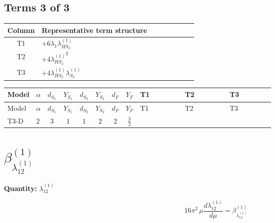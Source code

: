 \documentclass[8pt]{article}
\begin{document}
\begin{landscape}
\subsection*{Terms 3 of 3}
\begin{center}
\begin{tabular}{@{}c >{\raggedright\arraybackslash}p{0.82\linewidth}@{}}
\toprule
Column & Representative term structure \\
\midrule
T1 & \(\displaystyle +6 {\lambda_1} {\lambda_{HS_2}^{(1)}}\) \\
\midrule
T2 & \(\displaystyle +4 {\lambda_{HS_2}^{(1)}}^2\) \\
\midrule
T3 & \(\displaystyle +4 {\lambda_{HS_2}^{(1)}} {\lambda_{S_2}^{(1)}}\) \\
\midrule
\bottomrule
\end{tabular}
\end{center}
\smallskip
\tiny
\begin{longtable}{@{}llcccccc >{\raggedright\arraybackslash}p{0.21\linewidth} >{\raggedright\arraybackslash}p{0.21\linewidth} >{\raggedright\arraybackslash}p{0.21\linewidth}@{}}
\toprule
Model & $\alpha$ & $d_{S_1}$ & $Y_{S_1}$ & $d_{S_2}$ & $Y_{S_2}$ & $d_F$ & $Y_F$ & T1 & T2 & T3 \\
\midrule
\endfirsthead
\toprule
Model & $\alpha$ & $d_{S_1}$ & $Y_{S_1}$ & $d_{S_2}$ & $Y_{S_2}$ & $d_F$ & $Y_F$ & T1 & T2 & T3 \\
\midrule
\endhead
T3-D & $2$ & $3$ & $1$ & $1$ & $2$ & $2$ & $\frac{3}{2}$ & \scriptsize\adjustbox{max width=\linewidth}{$\begin{gathered} +6 {\lambda_1} {\lambda_{HS_2}^{(1)}}\end{gathered}$} & \scriptsize\adjustbox{max width=\linewidth}{$\begin{gathered} +4 {\lambda_{HS_2}^{(1)}}^2\end{gathered}$} & \scriptsize\adjustbox{max width=\linewidth}{$\begin{gathered} +4 {\lambda_{HS_2}^{(1)}} {\lambda_{S_2}^{(1)}}\end{gathered}$} \\
\midrule
\bottomrule
\end{longtable}
\clearpage
\section*{$\beta_{\lambda_{12}^{(1)}}^{(1)}$}
\noindent\textbf{Quantity: }$\lambda_{12}^{(1)}$\par\smallskip
\[16\pi^2\,\mu\frac{d \lambda_{12}^{(1)}}{d\mu}=\beta_{\lambda_{12}^{(1)}}^{(1)}\]

\end{landscape}
\end{document}
